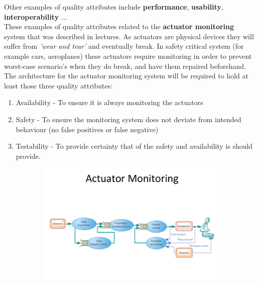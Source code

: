 \documentclass[a4paper]{report}
\begin{document}
Other examples of quality attributes include \textbf{performance}, \textbf{usability}, \textbf{interoperability} ...\\

These examples of quality attributes related to the \textbf{actuator monitoring} system that was described in lectures. As actuators are physical devices they will suffer from \textit{'wear and tear'} and eventually break. In safety critical system (for example cars, aeroplanes) these actuators require monitoring in order to prevent worst-case scenario's when they do break, and have them repaired beforehand.\\

The architecture for the actuator monitoring system will be required to hold at least those three quality attributes:
\begin{enumerate}
\item Availability - To ensure it is always monitoring the actuators
\item Safety - To ensure the monitoring system does not deviate from intended behaviour (no false positives or false negative)
\item Testability - To provide certainty that of the safety and availability is should provide.
\end{enumerate}

\begin{figure}[H]
\centering
\begin{subfigure}{1\textwidth}
  \includegraphics[width=1\linewidth]
  {images/3-actuator-monitoring-architecture.png}
\end{subfigure}
\end{figure}
\end{document}
